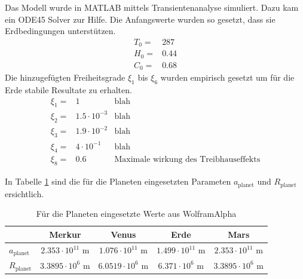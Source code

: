 \begin{refsection}
Das Modell wurde in MATLAB mittels Transientenanalyse simuliert. Dazu kam ein ODE45 Solver zur Hilfe. Die Anfangswerte wurden so gesetzt, dass sie Erdbedingungen unterstützen.  
\begin{equation}
\begin{matrix}
T_0 = & 287 \\
H_0 = & 0.44 \\
C_0 = & 0.68
\end{matrix}
\end{equation}
Die hinzugefügten Freiheitsgrade $\xi_1$ bis $\xi_6$ wurden empirisch gesetzt um für die Erde stabile Resultate zu erhalten.
\begin{equation}
\begin{matrix}
\xi_1 = & 1                 & \text{blah} \\
\xi_2 = & 1.5 \cdot 10^{-3} & \text{blah} \\
\xi_3 = & 1.9 \cdot 10^{-2} & \text{blah} \\
\xi_4 = & 4   \cdot 10^{-1} & \text{blah} \\
\xi_8 = & 0.6				& \text{Maximale wirkung des Treibhauseffekts}
\end{matrix}
\end{equation}

In Tabelle \ref{planeten:planetValues} sind die für die Planeten eingesetzten Parameten $a_{\text{planet}}$ und $R_{\text{planet}}$ ersichtlich.
\begin{center}
\begin{table}
	\center
	\begin{tabular}{l|c c c c}
                        & Merkur                    & Venus                    & Erde                    & Mars     \\
  \hline
  $a_{\text{planet}}$   & $2.353 \cdot 10^{11}$ m   & $1.076 \cdot 10^{11}$ m  & $1.499 \cdot 10^{11}$ m & $2.353 \cdot 10^{11}$ m \\
  $R_{\text{planet}}$   & $3.3895 \cdot 10^{6}$ m   & $6.0519 \cdot 10^{6}$ m  & $6.371 \cdot 10^{6}$ m  & $3.3895 \cdot 10^{6}$ m 
\end{tabular}
\caption{Für die Planeten eingesetzte Werte aus WolframAlpha}
\label{planeten:planetValues}
\end{table}
\end{center}






\end{refsection}

